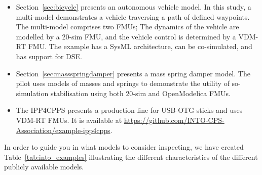 \begin{itemize}
  \item Section~\ref{sec:bicycle} presents an autonomous vehicle model. In this study, a multi-model demonstrates a vehicle traversing a path of defined waypoints. The multi-model comprises two FMUs; The dynamics of the vehicle are modelled by a 20-sim FMU, and the vehicle control is determined by a VDM-RT FMU. The example has a SysML architecture, can be co-simulated, and has support for DSE.
  \item Section~\ref{sec:massspringdamper} presents a mass spring damper model. The pilot uses models of masses and springs to demonstrate the utility of so-simulation stabilisation using both 20-sim and OpenModelica FMUs.
  \item The IPP4CPPS presents a production line for USB-OTG sticks and uses VDM-RT FMUs. It is available at \url{https://github.com/INTO-CPS-Association/example-ipp4cpps}.
 
  
\end{itemize}

In order to guide you in what models to consider inspecting, we have created Table~\ref{tab:into_examples} illustrating the different characteristics of the different publicly available models. 

